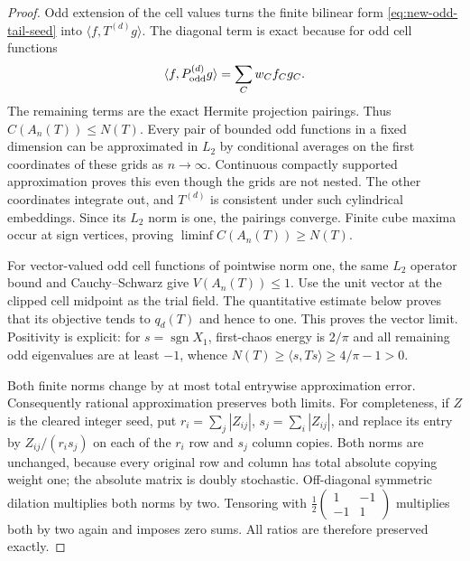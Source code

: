 \begin{proof}
Odd extension of the cell values turns the finite bilinear form
\eqref{eq:new-odd-tail-seed} into $\langle f,T^{(d)}g\rangle$.
The diagonal term is exact because for odd cell functions
\[
 \langle f,P_{\rm odd}^{(d)}g\rangle
           =\sum_Cw_Cf_Cg_C.
\]
The remaining terms are the exact Hermite projection pairings.
Thus $C(A_n(T))\leq N(T)$.  Every pair of bounded odd functions in a
fixed dimension can be approximated in $L_2$ by conditional averages
on the first coordinates of these grids as $n\to\infty$.
Continuous compactly supported approximation proves this even though
the grids are not nested.  The other coordinates integrate out, and
$T^{(d)}$ is consistent under such cylindrical embeddings.  Since
its $L_2$ norm is one, the pairings converge.  Finite cube maxima
occur at sign vertices, proving $\liminf C(A_n(T))\geq N(T)$.

For vector-valued odd cell functions of pointwise norm one, the same
$L_2$ operator bound and Cauchy--Schwarz give $V(A_n(T))\leq1$.
Use the unit vector at the clipped cell midpoint as the trial field.
The quantitative estimate below proves that its objective tends to
$q_d(T)$ and hence to one.  This proves the vector limit.  Positivity
is explicit: for $s=\operatorname{sgn}X_1$, first-chaos energy is
$2/\pi$ and all remaining odd eigenvalues are at least $-1$, whence
$N(T)\geq\langle s,Ts\rangle\geq4/\pi-1>0$.

Both finite norms change by at most total entrywise approximation
error.  Consequently rational approximation preserves both limits.
For completeness, if $Z$ is the cleared integer seed, put
$r_i=\sum_j|Z_{ij}|$, $s_j=\sum_i|Z_{ij}|$, and replace its entry by
$Z_{ij}/(r_is_j)$ on each of the $r_i$ row and $s_j$ column copies.
Both norms are unchanged, because every original row and column has
total absolute copying weight one; the absolute matrix is doubly
stochastic.  Off-diagonal symmetric dilation multiplies both norms
by two.  Tensoring with
$\tfrac12\left(\begin{smallmatrix}1&-1\\-1&1\end{smallmatrix}\right)$
multiplies both by two again and imposes zero sums.  All ratios are
therefore preserved exactly.
\end{proof}

